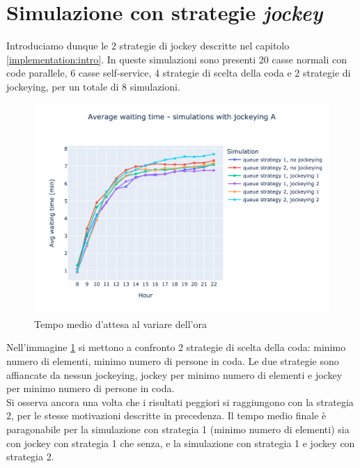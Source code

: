 \section{Simulazione con strategie \textit{jockey}}

Introduciamo dunque le 2 strategie di jockey descritte nel capitolo \ref{implementation:intro}. In queste simulazioni sono presenti 20 casse normali con code parallele, 6 casse self-service, 4 strategie di scelta della coda e 2 strategie di jockeying, per un totale di 8 simulazioni.

\begin{figure}[H]
	\centering
	\includegraphics[width=12cm]{"images/results/avg_wt_jockey_a.png"}
	
	\caption{Tempo medio d'attesa al variare dell'ora}
	\label{fig:avg_wt_jockey_a}
\end{figure}

Nell'immagine \ref{fig:avg_wt_jockey_a} si mettono a confronto 2 strategie di scelta della coda: minimo numero di elementi, minimo numero di persone in coda. Le due strategie sono affiancate da nessun jockeying, jockey per minimo numero di elementi e jockey per minimo numero di persone in coda. \\ 
Si osserva ancora una volta che i risultati peggiori si raggiungono con la strategia 2, per le stesse motivazioni descritte in precedenza. Il tempo medio finale è paragonabile per la simulazione con strategia 1 (minimo numero di elementi) sia con jockey con strategia 1 che senza, e la simulazione con strategia 1 e jockey con strategia 2.

